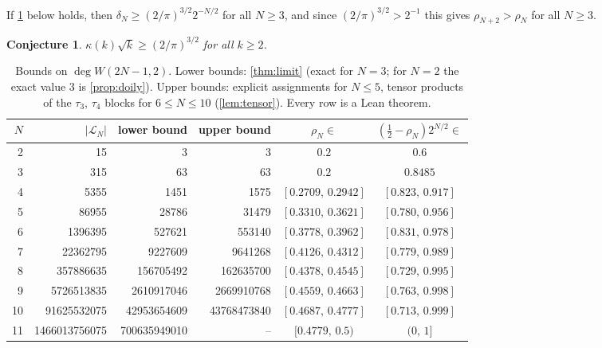 \documentclass[a4paper,onecolumn,11pt,unpublished,nopdfoutputerror]{quantumarticle}
\newtheorem{conjecture}[theorem]{Conjecture}
\theoremstyle{definition}
\renewcommand{\deg}{\operatorname{deg}}
\newcommand{\Lines}{\mathcal{L}}
\newcommand{\W}[1]{W(#1,2)}
\begin{document}
If \cref{conj:kappa} below holds, then $\delta_N\ge(2/\pi)^{3/2}2^{-N/2}$ for all $N\ge3$, and since
$(2/\pi)^{3/2}>2^{-1}$ this gives $\rho_{N+2}>\rho_N$ for all $N\ge3$.

\begin{conjecture}\label{conj:kappa}
$\kappa(k)\sqrt k\ge(2/\pi)^{3/2}$ for all $k\ge2$.
\end{conjecture}

\begin{table}[t]
\centering\small
\renewcommand{\arraystretch}{1.1}
\begin{tabular}{@{}rrrrcc@{}}
\toprule
$N$ & $|\Lines_N|$ & lower bound & upper bound & $\rho_N\in$ & $(\tfrac12-\rho_N)2^{N/2}\in$\\\midrule
2 & 15 & 3 & 3 & $0.2$ & $0.6$\\
3 & 315 & 63 & 63 & $0.2$ & $0.8485$\\
4 & 5355 & 1451 & 1575 & $[0.2709,\,0.2942]$ & $[0.823,\,0.917]$\\
5 & 86955 & 28786 & 31479 & $[0.3310,\,0.3621]$ & $[0.780,\,0.956]$\\
6 & 1396395 & 527621 & 553140 & $[0.3778,\,0.3962]$ & $[0.831,\,0.978]$\\
7 & 22362795 & 9227609 & 9641268 & $[0.4126,\,0.4312]$ & $[0.779,\,0.989]$\\
8 & 357886635 & 156705492 & 162635700 & $[0.4378,\,0.4545]$ & $[0.729,\,0.995]$\\
9 & 5726513835 & 2610917046 & 2669910768 & $[0.4559,\,0.4663]$ & $[0.763,\,0.998]$\\
10 & 91625532075 & 42953654609 & 43768473840 & $[0.4687,\,0.4777]$ & $[0.713,\,0.999]$\\
11 & 1466013756075 & 700635949010 & -- & $[0.4779,\,0.5)$ & $(0,\,1]$\\
\bottomrule
\end{tabular}
\caption{Bounds on $\deg\W{2N-1}$. Lower bounds: \cref{thm:limit} (exact for $N=3$; for $N=2$ the exact value $3$
is \cref{prop:doily}). Upper bounds: explicit assignments for $N\le5$, tensor products of the $\tau_3$, $\tau_4$
blocks for $6\le N\le10$ (\cref{lem:tensor}). Every row is a Lean theorem.}
\label{tab:rho}
\end{table}
\end{document}
